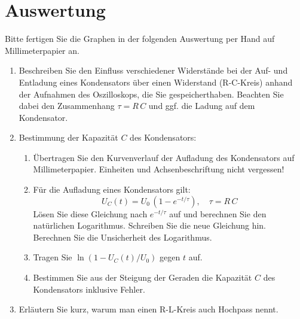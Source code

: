 \section{Auswertung} 
\begin{hint}
	Bitte fertigen Sie die Graphen in der folgenden Auswertung per Hand auf Millimeterpapier an.
\end{hint}

\begin{enumerate}
 \item Beschreiben Sie den Einfluss verschiedener Widerstände bei der Auf- und Entladung eines Kondensators über einen Widerstand (R-C-Kreis) anhand der Aufnahmen des Oszilloskops, die Sie gespeicherthaben. Beachten Sie dabei den Zusammenhang $\tau = R\,C$ und ggf. die Ladung auf dem Kondensator.
 \item Bestimmung der Kapazität $C$ des Kondensators:
  \begin{enumerate}
   \item Übertragen Sie den Kurvenverlauf der Aufladung des Kondensators auf Millimeterpapier. Einheiten und Achsenbeschriftung nicht vergessen!
   \item Für die Aufladung eines Kondensators gilt:
    \begin{equation}
     U_C(t) = U_0\, \left(1-e^{-t/\tau}\right), \quad \tau = R\, C
    \end{equation}
		Lösen Sie diese Gleichung nach $e^{-t/\tau}$ auf und berechnen Sie den natürlichen Logarithmus. Schreiben Sie die neue Gleichung hin. Berechnen Sie die Unsicherheit des Logarithmus.
   \item Tragen Sie $\ln\left(1-U_C(t)/U_0\right)$ gegen $t$ auf. 
   \item Bestimmen Sie aus der Steigung der Geraden die Kapazität $C$ des Kondensators inklusive Fehler. %
  \end{enumerate}
 \item Erläutern Sie kurz, warum man einen R-L-Kreis auch Hochpass nennt.
\end{enumerate}